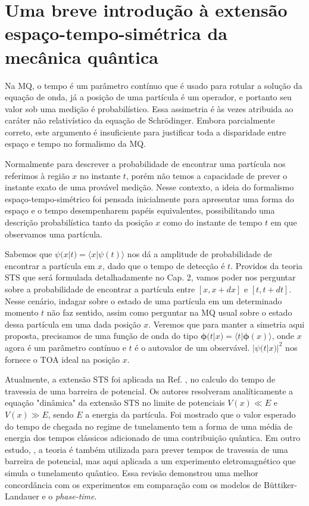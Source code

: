 \section{Uma breve introdução à extensão espaço-tempo-simétrica da mecânica quântica}
\label{objetivos}

Na MQ, o tempo é um parâmetro contínuo que é usado para rotular a solução da equação de onda, já a posição de uma partícula é um operador, e portanto seu valor sob uma medição é probabilístico. Essa assimetria é às vezes atribuida ao caráter não relativístico da equação de Schrödinger. Embora parcialmente correto, este argumento é insuficiente para justificar toda a disparidade entre espaço e tempo no formalismo da MQ.

Normalmente para descrever a probabilidade de encontrar uma partícula nos referimos à região $x$ no instante $t$, porém não temos a capacidade de prever o instante exato de uma provável medição. Nesse contexto, a ideia do formalismo espaço-tempo-simétrico foi pensada inicialmente para apresentar uma forma do espaço e o tempo desempenharem papéis equivalentes, possibilitando uma descrição probabilística tanto da posição $x$ como do instante de tempo $t$ em que observamos uma partícula.

Sabemos que $\psi(x| t) = \langle x|\psi(t)\rangle$ nos dá a amplitude de probabilidade de encontrar a partícula em $x$, dado que o tempo de detecção é $t$. Providos da teoria STS que será formulada detalhadamente no Cap. 2, vamos poder nos perguntar sobre a probabilidade de encontrar a partícula entre $[x, x + dx]$ e $[t, t + dt]$. Nesse cenário, indagar sobre o estado de uma partícula em um determinado momento $t$ não faz sentido, assim como perguntar na MQ usual sobre o estado dessa partícula em uma dada posição $x$. Veremos que para manter a simetria aqui proposta, precisamos de uma função de onda do tipo $\pmb{\phi}(t| x) = \langle t|\pmb{\phi}(x)\rangle$, onde $x$ agora é um parâmetro contínuo e $t$ é o autovalor de um observável. $|\psi(t|x)|^2$ nos fornece o TOA ideal na posição $x$.

Atualmente, a extensão STS foi aplicada na Ref. \cite{Parana}, no calculo do tempo de travessia de uma barreira de potencial. Os autores resolveram analíticamente a equação "dinâmica" da extensão STS no limite de potenciais $V(x) \ll E$ e  $V(x) \gg E$, sendo $E$ a energia da partícula. Foi mostrado que o valor esperado do tempo de chegada no regime de tunelamento tem a forma de uma média de energia dos tempos clássicos adicionado de uma contribuição quântica. Em outro estudo, \cite{Ricardo}, a teoria é também utilizada para prever tempos de travessia de uma barreira de potencial, mas aqui aplicada a um experimento eletromagnético que simula o tunelamento quântico. Essa revisão demonstrou uma melhor concordância com os experimentos em comparação com os modelos de Büttiker-Landauer e o \textit{phase-time}.